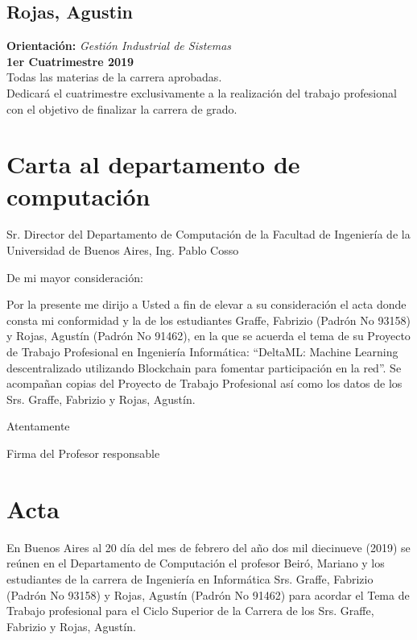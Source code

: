 \documentclass[
11pt, %
oneside, %
spanish, %
singlespacing, %
headsepline, %
chapterinoneline, %
]{MastersDoctoralThesis} %
\begin{document}
\section*{Rojas, Agustin} 

\raggedright\textbf{Orientación:} \textit{Gestión Industrial de Sistemas} \\
\textbf{1er Cuatrimestre 2019} \\
Todas las materias de la carrera aprobadas. \\ 
Dedicará el cuatrimestre exclusivamente a la realización del trabajo profesional con el objetivo de finalizar la carrera de grado.

\chapter{Carta al departamento de computación}

Sr. Director del Departamento de Computación de la Facultad de Ingeniería de la Universidad de Buenos Aires, Ing. Pablo Cosso

De mi mayor consideración: 

\justify
Por la presente me dirijo a Usted a fin de elevar a su consideración el acta donde consta mi conformidad y la de los estudiantes Graffe, Fabrizio (Padrón No 93158) y Rojas, Agustín (Padrón No 91462), en la que se acuerda el tema de su Proyecto de Trabajo Profesional en Ingeniería Informática: “DeltaML: Machine Learning descentralizado utilizando Blockchain para fomentar participaci\'on en la red”.
Se acompañan copias del Proyecto de Trabajo Profesional así como los datos de los Srs. Graffe, Fabrizio y Rojas, Agustín. \\

\raggedright
Atentamente \\
\raggedright
Firma del Profesor responsable



\chapter{Acta}

\justify
En Buenos Aires al 20 día del mes de febrero del año dos mil diecinueve (2019) se reúnen en el Departamento de Computación el profesor Beiró, Mariano y los estudiantes de la carrera de Ingeniería en Informática Srs. Graffe, Fabrizio (Padrón No 93158) y Rojas, Agustín (Padrón No 91462) para acordar el Tema de Trabajo profesional para el Ciclo Superior de la Carrera de los Srs. Graffe, Fabrizio y Rojas, Agustín.
\end{document}
